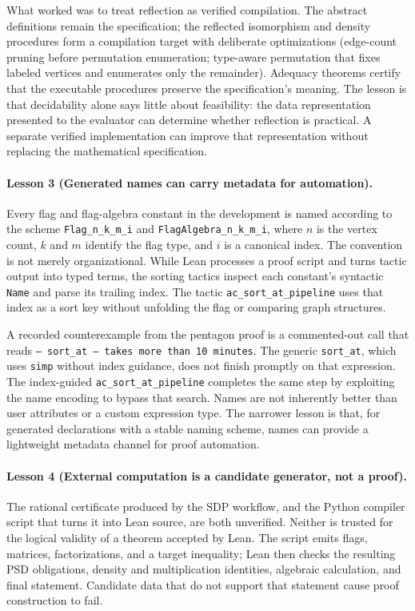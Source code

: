 \documentclass{article}
\newcommand{\lean}[1]{\texttt{#1}}
\begin{document}
{What worked was to treat reflection as verified compilation.  The abstract
definitions remain the specification; the reflected isomorphism and density
procedures form a compilation target with deliberate optimizations (edge-count
pruning before permutation enumeration; type-aware permutation that fixes
labeled vertices and enumerates only the remainder).  Adequacy theorems certify
that the executable procedures preserve the specification's meaning.  The
lesson is that decidability alone says little about feasibility: the data
representation presented to the evaluator can determine whether reflection is
practical.  A separate verified implementation can improve that representation
without replacing the mathematical specification.

\paragraph{Lesson 3 (Generated names can carry metadata for automation).}
Every flag and flag-algebra constant in the development is named according
to the scheme \lean{Flag\_n\_k\_m\_i} and \lean{FlagAlgebra\_n\_k\_m\_i},
where $n$ is the vertex count, $k$ and $m$ identify the flag type, and $i$
is a canonical index.  The convention is not merely organizational.  While
Lean processes a proof script and turns tactic output into typed terms, the
sorting tactics inspect each constant's syntactic \lean{Name} and parse its
trailing index.  The tactic \lean{ac\_sort\_at\_pipeline} uses that index as a
sort key without unfolding the flag or comparing graph structures.

A recorded counterexample from the pentagon proof is a commented-out call that
reads \texttt{-- sort\_at -- takes more than 10 minutes}.
The generic \lean{sort\_at}, which uses \lean{simp} without index guidance,
does not finish promptly on that expression.  The index-guided
\lean{ac\_sort\_at\_pipeline} completes the same step by exploiting the name
encoding to bypass that search.  Names are not inherently better than user
attributes or a custom expression type.  The narrower lesson is that, for
generated declarations with a stable naming scheme, names can provide a
lightweight metadata channel for proof automation.

\paragraph{Lesson 4 (External computation is a candidate generator, not a
proof).}
The rational certificate produced by the SDP workflow, and the Python
compiler script that turns it into Lean source, are both unverified.  Neither is
trusted for the logical validity of a theorem accepted by Lean.  The
script emits flags, matrices, factorizations, and a target inequality;
Lean then checks the resulting PSD obligations, density and multiplication
identities, algebraic calculation, and final statement.  Candidate data that
do not support that statement cause proof construction to fail.

}
\end{document}
